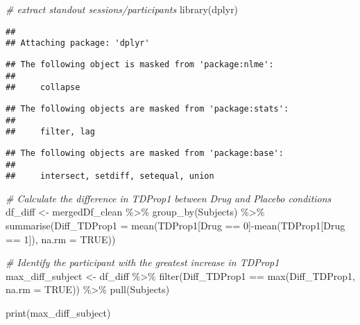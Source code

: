 \documentclass[
]{article}
\newenvironment{Shaded}{\begin{snugshade}}{\end{snugshade}}
\newcommand{\AttributeTok}[1]{\textcolor[rgb]{0.77,0.63,0.00}{#1}}
\newcommand{\CommentTok}[1]{\textcolor[rgb]{0.56,0.35,0.01}{\textit{#1}}}
\newcommand{\ConstantTok}[1]{\textcolor[rgb]{0.00,0.00,0.00}{#1}}
\newcommand{\DecValTok}[1]{\textcolor[rgb]{0.00,0.00,0.81}{#1}}
\newcommand{\FunctionTok}[1]{\textcolor[rgb]{0.00,0.00,0.00}{#1}}
\newcommand{\NormalTok}[1]{#1}
\newcommand{\OtherTok}[1]{\textcolor[rgb]{0.56,0.35,0.01}{#1}}
\newcommand{\SpecialCharTok}[1]{\textcolor[rgb]{0.00,0.00,0.00}{#1}}
\begin{document}
\begin{Shaded}
\begin{Highlighting}[]
\CommentTok{\# extract standout sessions/participants}
\FunctionTok{library}\NormalTok{(dplyr)}
\end{Highlighting}
\end{Shaded}

\begin{verbatim}
## 
## Attaching package: 'dplyr'
\end{verbatim}

\begin{verbatim}
## The following object is masked from 'package:nlme':
## 
##     collapse
\end{verbatim}

\begin{verbatim}
## The following objects are masked from 'package:stats':
## 
##     filter, lag
\end{verbatim}

\begin{verbatim}
## The following objects are masked from 'package:base':
## 
##     intersect, setdiff, setequal, union
\end{verbatim}

\begin{Shaded}
\begin{Highlighting}[]
\CommentTok{\# Calculate the difference in TDProp1 between Drug and Placebo conditions}
\NormalTok{df\_diff }\OtherTok{\textless{}{-}}\NormalTok{ mergedDf\_clean }\SpecialCharTok{\%\textgreater{}\%}
  \FunctionTok{group\_by}\NormalTok{(Subjects) }\SpecialCharTok{\%\textgreater{}\%}
  \FunctionTok{summarise}\NormalTok{(}\AttributeTok{Diff\_TDProp1 =} \FunctionTok{mean}\NormalTok{(TDProp1[Drug }\SpecialCharTok{==} \DecValTok{0}\NormalTok{]}\SpecialCharTok{{-}}\FunctionTok{mean}\NormalTok{(TDProp1[Drug }\SpecialCharTok{==} \DecValTok{1}\NormalTok{]), }\AttributeTok{na.rm =} \ConstantTok{TRUE}\NormalTok{))}

\CommentTok{\# Identify the participant with the greatest increase in TDProp1}
\NormalTok{max\_diff\_subject }\OtherTok{\textless{}{-}}\NormalTok{ df\_diff }\SpecialCharTok{\%\textgreater{}\%}
  \FunctionTok{filter}\NormalTok{(Diff\_TDProp1 }\SpecialCharTok{==} \FunctionTok{max}\NormalTok{(Diff\_TDProp1, }\AttributeTok{na.rm =} \ConstantTok{TRUE}\NormalTok{)) }\SpecialCharTok{\%\textgreater{}\%}
  \FunctionTok{pull}\NormalTok{(Subjects)}

\FunctionTok{print}\NormalTok{(max\_diff\_subject)}
\end{Highlighting}
\end{Shaded}
\end{document}
